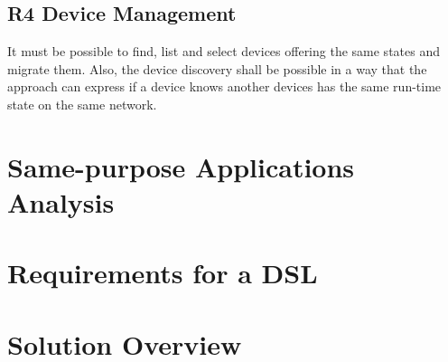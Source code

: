 \subsection{R4 Device Management}
It must be possible to find, list and select devices offering the same states and migrate them. Also, the device discovery shall be possible in a way that the approach can express if a device knows another devices has the same run-time state on the same network.


\section{Same-purpose Applications Analysis}


\section{Requirements for a DSL}


\section{Solution Overview}
